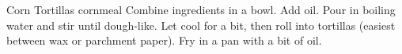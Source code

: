\begin{recipe}{Corn Tortillas}{}{}
\freeform cornmeal
Combine ingredients in a bowl.
Add oil. Pour in boiling water and stir until dough-like. Let cool for a bit, then roll into tortillas (easiest between wax or parchment paper). Fry in a pan with a bit of oil.
\end{recipe}

